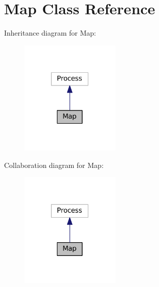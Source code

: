 \hypertarget{classMap}{\section{Map Class Reference}
\label{classMap}
}


Inheritance diagram for Map\+:
\nopagebreak
\begin{figure}[H]
\begin{center}
\leavevmode
\includegraphics[width=134pt]{classMap__inherit__graph}
\end{center}
\end{figure}


Collaboration diagram for Map\+:
\nopagebreak
\begin{figure}[H]
\begin{center}
\leavevmode
\includegraphics[width=134pt]{classMap__coll__graph}
\end{center}
\end{figure}

